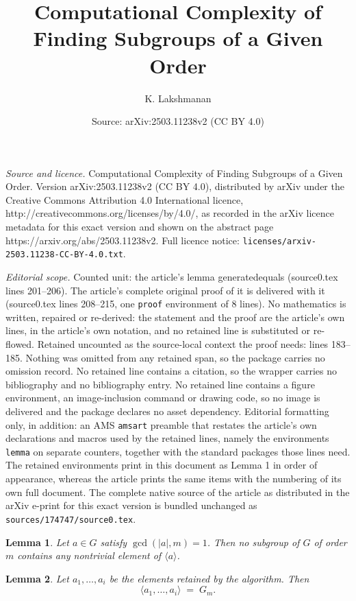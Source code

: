 \documentclass[10pt,a4paper]{amsart}
\title{Computational Complexity of Finding Subgroups of a Given Order}
\author{K. Lakshmanan}
\date{Source: arXiv:2503.11238v2 (CC BY 4.0)}
\newtheorem{lemma}{Lemma}
\begin{document}
\maketitle

\noindent\emph{Source and licence.} Computational Complexity of Finding Subgroups of a Given Order. Version arXiv:2503.11238v2 (CC BY 4.0), distributed by arXiv under the Creative Commons Attribution 4.0 International licence, http://creativecommons.org/licenses/by/4.0/, as recorded in the arXiv licence metadata for this exact version and shown on the abstract page https://arxiv.org/abs/2503.11238v2. Full licence notice: \texttt{licenses/arxiv-2503.11238-CC-BY-4.0.txt}.\par\smallskip

\noindent\textit{Editorial scope.} Counted unit: the article's lemma generatedequals (source0.tex lines 201--206). The article's complete original proof of it is delivered with it (source0.tex lines 208--215, one \texttt{proof} environment of 8 lines). No mathematics is written, repaired or re-derived: the statement and the proof are the article's own lines, in the article's own notation, and no retained line is substituted or re-flowed.  Retained uncounted as the source-local context the proof needs: lines 183--185.  Nothing was omitted from any retained span, so the package carries no omission record.  No retained line contains a citation, so the wrapper carries no bibliography and no bibliography entry.  No retained line contains a figure environment, an image-inclusion command or drawing code, so no image is delivered and the package declares no asset dependency.  Editorial formatting only, in addition: an AMS \texttt{amsart} preamble that restates the article's own declarations and macros used by the retained lines, namely the environments \texttt{lemma} on separate counters, together with the standard packages those lines need.  The retained environments print in this document as Lemma 1 in order of appearance, whereas the article prints the same items with the numbering of its own full document.  The complete native source of the article as distributed in the arXiv e-print for this exact version is bundled unchanged as \texttt{sources/174747/source0.tex}.
	\begin{lemma}\label{coprimelemma}
		Let $a \in G$ satisfy $\gcd(|a|,m)=1$. Then no subgroup of $G$ of order $m$ contains any nontrivial element of $\langle a \rangle$.
	\end{lemma}

	\begin{lemma}\label{generatedequals}
		Let $a_1,\dots,a_i$ be the elements retained by the algorithm. Then
		\[
		\langle a_1,\dots,a_i\rangle \;=\; G_m.
		\]
	\end{lemma}
\end{document}
